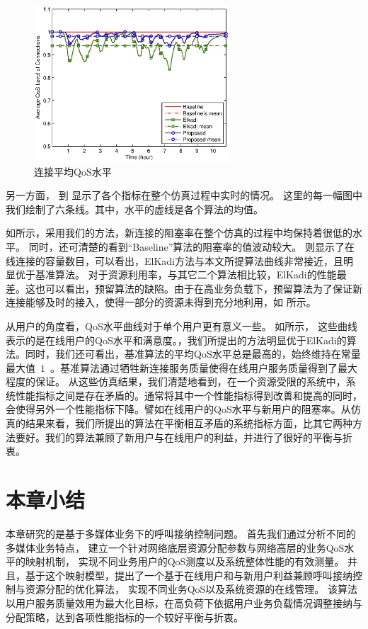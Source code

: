 % 
\begin{figure}[htbp]
\centering
\includegraphics[width=0.65\textwidth] {cacop_avg_qos.eps}
\caption{连接平均QoS水平}\label{fig:chap_cacop:clock_avg_call_qos}
\end{figure}



另一方面， 到  显示了各个指标在整个仿真过程中实时的情况。
这里的每一幅图中我们绘制了六条线。其中，水平的虚线是各个算法的均值。

如所示，采用我们的方法，新连接的阻塞率在整个仿真的过程中均保持着很低的水平。
同时，还可清楚的看到“Baseline”算法的阻塞率的值波动较大。
 则显示了在线连接的容量数目，可以看出，ElKadi方法与本文所提算法曲线非常接近，且明显优于基准算法。
对于资源利用率，与其它二个算法相比较，ElKadi的性能最差。这也可以看出，预留算法的缺陷。由于在高业务负载下，预留算法为了保证新连接能够及时的接入，使得一部分的资源未得到充分地利用，如 所示。
 
从用户的角度看，QoS水平曲线对于单个用户更有意义一些。
如所示，
这些曲线表示的是在线用户的QoS水平和满意度。，我们所提出的方法明显优于ElKadi的算法。同时，我们还可看出，基准算法的平均QoS水平总是最高的，始终维持在常量最大值~$1$~。基准算法通过牺牲新连接服务质量使得在线用户服务质量得到了最大程度的保证。
从这些仿真结果，我们清楚地看到，在一个资源受限的系统中，系统性能指标之间是存在矛盾的。通常将其中一个性能指标得到改善和提高的同时，会使得另外一个性能指标下降。譬如在线用户的QoS水平与新用户的阻塞率。从仿真的结果来看，我们所提出的算法在平衡相互矛盾的系统指标方面，比其它两种方法要好。我们的算法兼顾了新用户与在线用户的利益，并进行了很好的平衡与折衷。

\section{本章小结}
本章研究的是基于多媒体业务下的呼叫接纳控制问题。
首先我们通过分析不同的多媒体业务特点，
建立一个针对网络底层资源分配参数与网络高层的业务QoS水平的映射机制，
实现不同业务用户的QoS测度以及系统整体性能的有效测量。
并且，基于这个映射模型，提出了一个基于在线用户和与新用户利益兼顾呼叫接纳控制与资源分配的优化算法，
实现不同业务QoS以及系统资源的在线管理。
该算法以用户服务质量效用为最大化目标，在高负荷下依据用户业务负载情况调整接纳与分配策略，达到各项性能指标的一个较好平衡与折衷。
%


